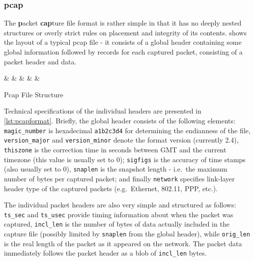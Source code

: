 \tocless\subsubsection{pcap}
\label{sec:formats:pcap}
The \textbf{p}acket \textbf{cap}ture file format is rather simple in that it has no deeply nested structures or
overly strict rules on placement and integrity of its contents.  shows the layout of a
typical pcap file - it consists of a global header containing some global information followed by records for
each captured packet, consisting of a packet header and data.

\begin{listing}[htb]
\centering
\begin{bytefield}[boxformatting={\centering\tiny}]{32}
 &
 &
 &
 &
 &
\end{bytefield}
\caption{Pcap File Structure}
\label{lst:pcapfile}
\end{listing}

Technical specifications of the individual headers are presented in \cref{lst:pcapformat}. 
Briefly, the global header consists of the following elements:
\texttt{magic\_number} is hexadecimal \texttt{a1b2c3d4} for determining the endianness of the file,
\texttt{version\_major} and \texttt{version\_minor} denote the format version (currently 2.4),
\texttt{thiszone} is the correction time in seconds between GMT and the current timezone (this value is
usually set to 0); \texttt{sigfigs} is the accuracy of time stamps (also usually set to 0), \texttt{snaplen} is
the snapshot length - i.e.\ the maximum number of bytes per captured packet; and finally \texttt{network}
specifies link-layer header type of the captured packets (e.g.\ Ethernet, 802.11, PPP, etc.).

The individual packet headers are also very simple and structured as follows:
\texttt{ts\_sec} and \texttt{ts\_usec} provide timing information about when the packet was captured,
\texttt{incl\_len} is the number of bytes of data actually included in the capture file (possibly
limited by \texttt{snaplen} from the global header), while \texttt{orig\_len} is the
real length of the packet as it appeared on the network.
The packet data immediately follows the packet header as a blob of \texttt{incl\_len} bytes.


